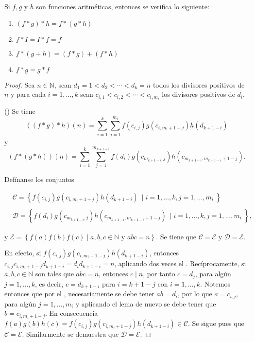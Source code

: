 \begin{proposition}
Si $f,g$ y $h$ son funciones aritméticas, entonces se verifica lo siguiente:

\begin{enumerate}[label=\textnormal{(\roman*)}]
	\item $(f*g)*h=f*(g*h)$
	\item $f*I=I*f=f$
	\item $f*(g+h)=(f*g)+(f*h)$
	\item $f*g=g*f$
\end{enumerate}
\end{proposition}
\begin{proof}
Sea $n\in\mathbb{N}$, sean $d_1=1<d_2<\cdots<d_k=n$ todos los divisores positivos de $n$ y para cada $i=1,\ldots,k$ sean $c_{i,1}<c_{i,2}<\cdots<c_{i,m_i}$ los divisores positivos de $d_i$.
\bigskip

({\scshape {}}) Se tiene
\begin{equation}\label{eqn:sum1}
	((f*g)*h)(n)=\sum_{i=1}^{k} \sum_{j=1}^{m_i} f(c_{i,j})g(c_{i,m_i+1-j})h(d_{k+1-i})
\end{equation}
y 
\begin{equation}\label{eqn:sum2}
	(f*(g*h))(n)=\sum_{i=1}^{k} \sum_{j=1}^{m_{k+1-i}} f(d_i)g(c_{m_{k+1-i},j})h(c_{m_{k+1-i},m_{k+1-i}+1-j}).
\end{equation}

Defínanse los conjuntos

\begin{align*}
	& \mathcal{C} = \left\{f(c_{i,j})g(c_{i,m_i+1-j})h(d_{k+1-i}) \: \mid i=1,\ldots,k,j=1,\ldots,m_i \: \right\} \\
	& \\
	& \mathcal{D} = \left\{f(d_i)g(c_{m_{k+1-i},j})h(c_{m_{k+1-i},m_{k+1-i}+1-j}) \: \mid i=1,\ldots,k,j=1,\ldots,m_i \: \right\},
\end{align*}

y $\mathcal{E} = \left\{f(a)f(b)f(c) \mid a,b,c\in\mathbb{N} \textrm{ y } a b c=n\right\}$. Se tiene que $\mathcal{C}=\mathcal{E}$ y $\mathcal{D}=\mathcal{E}$.
\bigskip

En efecto, si $f(c_{i,j})g(c_{i,m_i+1-j})h(d_{k+1-i})$, entonces $c_{i,j}c_{i,m_i+1-j}d_{k+1-i}=d_i d_{k+1-i}=n$, aplicando dos veces el . Recíprocamente, si $a,b,c\in\mathbb{N}$ son tales que $a b c = n$, entonces $c \mid n$, por tanto $c=d_j$, para algún $j=1,\ldots,k$, es decir, $c=d_{k+1-i}$ para $i=k+1-j$ con $i=1,\ldots,k$. Notemos entonces que por el , necesariamente se debe tener $a b=d_i$, por lo que $a=c_{i,j}$, para algún $j=1,\ldots,m_i$ y aplicando el lema de nuevo se debe tener que $b=c_{i,m_i+1-j}$. En consecuencia $f(a)g(b)h(c)=f(c_{i,j})g(c_{i,m_i+1-j})h(d_{k+1-i})\in \mathcal{C}$. Se sigue pues que $\mathcal{C}=\mathcal{E}$. Similarmente se demuestra que $\mathcal{D}=\mathcal{E}$.
\bigskip


\end{proof}
